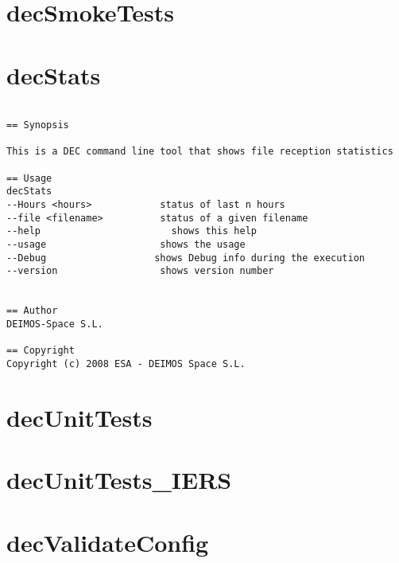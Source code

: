 \documentclass[dec_sum_main.tex]{subfiles}
\begin{document}
\section{decSmokeTests}

\label{decStats}
\section{decStats}

\begin{verbatim}

== Synopsis

This is a DEC command line tool that shows file reception statistics  

== Usage
decStats
--Hours <hours>            status of last n hours
--file <filename>          status of a given filename
--help                     	 shows this help
--usage                    shows the usage
--Debug                   shows Debug info during the execution
--version                  shows version number


== Author
DEIMOS-Space S.L.

== Copyright
Copyright (c) 2008 ESA - DEIMOS Space S.L.

\end{verbatim}

\section{decUnitTests}

\section{decUnitTests\_IERS}

\section{decValidateConfig}
\end{document}
